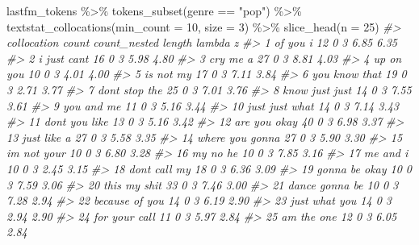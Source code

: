 \documentclass[
]{article}
\newenvironment{Shaded}{\begin{snugshade}}{\end{snugshade}}
\newcommand{\AttributeTok}[1]{\textcolor[rgb]{0.77,0.63,0.00}{#1}}
\newcommand{\CommentTok}[1]{\textcolor[rgb]{0.56,0.35,0.01}{\textit{#1}}}
\newcommand{\DecValTok}[1]{\textcolor[rgb]{0.00,0.00,0.81}{#1}}
\newcommand{\FunctionTok}[1]{\textcolor[rgb]{0.00,0.00,0.00}{#1}}
\newcommand{\NormalTok}[1]{#1}
\newcommand{\SpecialCharTok}[1]{\textcolor[rgb]{0.00,0.00,0.00}{#1}}
\newcommand{\StringTok}[1]{\textcolor[rgb]{0.31,0.60,0.02}{#1}}
\begin{document}
\begin{Shaded}
\begin{Highlighting}[]
\NormalTok{lastfm\_tokens }\SpecialCharTok{\%\textgreater{}\%}
    \FunctionTok{tokens\_subset}\NormalTok{(genre }\SpecialCharTok{==} \StringTok{"pop"}\NormalTok{) }\SpecialCharTok{\%\textgreater{}\%}
    \FunctionTok{textstat\_collocations}\NormalTok{(}\AttributeTok{min\_count =} \DecValTok{10}\NormalTok{, }\AttributeTok{size =} \DecValTok{3}\NormalTok{) }\SpecialCharTok{\%\textgreater{}\%}
    \FunctionTok{slice\_head}\NormalTok{(}\AttributeTok{n =} \DecValTok{25}\NormalTok{)}
\CommentTok{\#\textgreater{}        collocation count count\_nested length lambda    z}
\CommentTok{\#\textgreater{} 1         of you i    12            0      3   6.85 6.35}
\CommentTok{\#\textgreater{} 2     i just can\textquotesingle{}t    16            0      3   5.98 4.80}
\CommentTok{\#\textgreater{} 3         cry me a    27            0      3   8.81 4.03}
\CommentTok{\#\textgreater{} 4        up on you    10            0      3   4.01 4.00}
\CommentTok{\#\textgreater{} 5        is not my    17            0      3   7.11 3.84}
\CommentTok{\#\textgreater{} 6    you know that    19            0      3   2.71 3.77}
\CommentTok{\#\textgreater{} 7   don\textquotesingle{}t stop the    25            0      3   7.01 3.76}
\CommentTok{\#\textgreater{} 8   know just just    14            0      3   7.55 3.61}
\CommentTok{\#\textgreater{} 9       you and me    11            0      3   5.16 3.44}
\CommentTok{\#\textgreater{} 10  just just what    14            0      3   7.14 3.43}
\CommentTok{\#\textgreater{} 11  don\textquotesingle{}t you like    13            0      3   5.16 3.42}
\CommentTok{\#\textgreater{} 12    are you okay    40            0      3   6.98 3.37}
\CommentTok{\#\textgreater{} 13     just like a    27            0      3   5.58 3.35}
\CommentTok{\#\textgreater{} 14 where you gonna    27            0      3   5.90 3.30}
\CommentTok{\#\textgreater{} 15    i\textquotesingle{}m not your    10            0      3   6.80 3.28}
\CommentTok{\#\textgreater{} 16        my no he    10            0      3   7.85 3.16}
\CommentTok{\#\textgreater{} 17        me and i    10            0      3   2.45 3.15}
\CommentTok{\#\textgreater{} 18   don\textquotesingle{}t call my    18            0      3   6.36 3.09}
\CommentTok{\#\textgreater{} 19   gonna be okay    10            0      3   7.59 3.06}
\CommentTok{\#\textgreater{} 20    this my shit    33            0      3   7.46 3.00}
\CommentTok{\#\textgreater{} 21  dance gonna be    10            0      3   7.28 2.94}
\CommentTok{\#\textgreater{} 22  because of you    14            0      3   6.19 2.90}
\CommentTok{\#\textgreater{} 23   just what you    14            0      3   2.94 2.90}
\CommentTok{\#\textgreater{} 24   for your call    11            0      3   5.97 2.84}
\CommentTok{\#\textgreater{} 25      am the one    12            0      3   6.05 2.84}
\end{Highlighting}
\end{Shaded}
\end{document}
